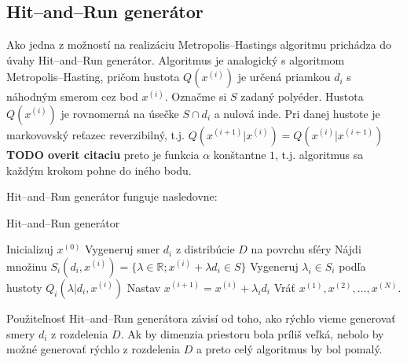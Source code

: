 \subsection{Hit--and--Run generátor}

Ako jedna z možností na realizáciu Metropolis--Hastings algoritmu prichádza do úvahy Hit--and--Run generátor. Algoritmus je analogický s algoritmom Metropolis--Hasting, pričom hustota $Q(x^{(i)})$ je určená priamkou $d_i$ s náhodným smerom cez bod $x^{(i)}$. Označme si $S$ zadaný polyéder. Hustota $Q(x^{(i)})$ je rovnomerná na úsečke $S \cap d_i$ a nulová inde. Pri danej hustote je markovovský reťazec reverzibilný, t.j. $Q(x^{(i+1)}|x^{(i)})=Q(x^{(i)}|x^{(i+1)})$ \cite{hit-and-run_chen} \textbf{TODO overit citaciu} preto je funkcia $\alpha$ konštantne $1$, t.j. algoritmus sa každým krokom pohne do iného bodu.

Hit--and--Run generátor funguje nasledovne:

\begin{algorithm}[H]
	\caption{Hit--and--Run generátor \cite{hit-and-run_chen}}
	\label{hit--and--run}
	\begin{algorithmic}[1]
		\State Inicializuj $x^{(0)}$
			\State Vygeneruj smer $d_i$ z distribúcie $D$ na povrchu sféry
			\State Nájdi množinu $S_i(d_i,x^{(i)})=\{\lambda \in \mathbb{R}; x^{(i)} + \lambda d_i \in S \} $
			\State Vygeneruj $\lambda_i \in S_i$ podľa hustoty $Q_i(\lambda | d_i, x^{(i)})$
			\State Nastav $x^{(i+1)}=x^{(i)}+\lambda_i d_i$
		\EndFor
		\State Vráť $x^{(1)},x^{(2)},\dots,x^{(N)}$.
	\end{algorithmic}
\end{algorithm}

Použiteľnosť Hit--and--Run generátora závisí od toho, ako rýchlo vieme generovať smery $d_i$ z rozdelenia $D$. Ak by dimenzia priestoru bola príliš veľká, nebolo by možné generovať rýchlo z rozdelenia $D$ a preto celý algoritmus by bol pomalý.

